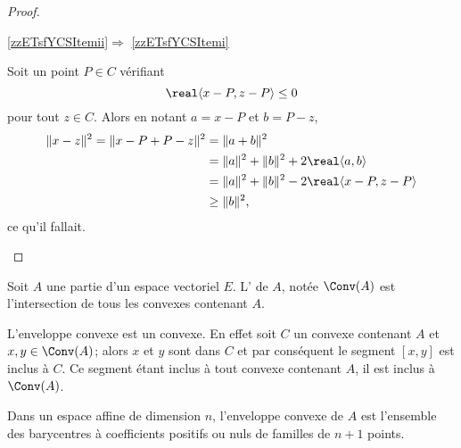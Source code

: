 \begin{proof}
\begin{subproof}
        \item[\ref{zzETsfYCSItemii}\( \Rightarrow\) \ref{zzETsfYCSItemi}]

            Soit un point \( P\in C\) vérifiant 
            \begin{equation}
                \real\langle x-P, z-P\rangle \leq 0
            \end{equation}
            pour tout \( z\in C\). Alors en notant \( a=x-P\) et \( b=P-z\),
            \begin{equation}
                \begin{aligned}[]
                \| x-z \|^2=\| x-P+P-z \|^2&=\| a+b \|^2\\
                &=\| a \|^2+\| b \|^2+2\real\langle a, b\rangle \\
                &=\| a \|^2+\| b \|^2-2\real\langle x-P, z-P\rangle \\
                &\geq \| b \|^2,
                \end{aligned}
            \end{equation}
            ce qu'il fallait.

    \end{subproof}

\end{proof}

\begin{definition}
    Soit \( A\) une partie d'un espace vectoriel \( E\). L' de \( A\), notée \( \Conv(A)\) est l'intersection de tous les convexes contenant \( A\).
\end{definition}
L'enveloppe convexe est un convexe. En effet soit \( C\) un convexe contenant \( A\) et \( x,y\in\Conv(A)\); alors \( x\) et \( y \) sont dans \( C\) et par conséquent le segment \( [x,y]\) est inclus à \( C\). Ce segment étant inclus à tout convexe contenant \( A\), il est inclus à \( \Conv(A)\).

\begin{theorem} \label{ThoJLDjXLe}
    Dans un espace affine de dimension \( n\), l'enveloppe convexe de \( A\) est l'ensemble des barycentres à coefficients positifs ou nuls de familles de \( n+1\) points.
\end{theorem}

